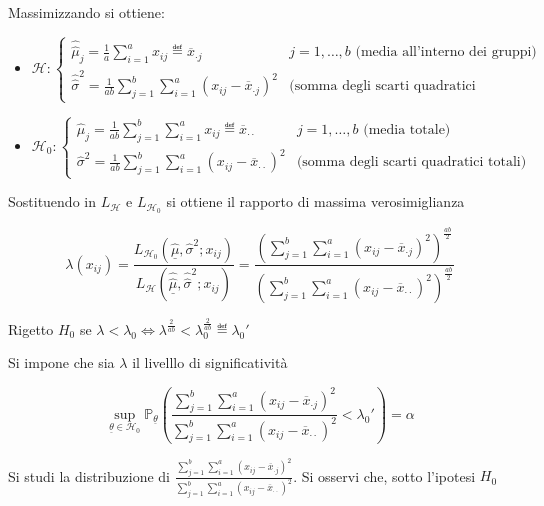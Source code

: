 \documentclass[hidelinks, 10pt]{report}
\begin{document}
Massimizzando si ottiene:
\begin{itemize}
\item $ \mathcal{H}: \begin{cases} \hat{\hat{\mu}}_{j} = \frac{1}{a} \sum\limits_{i = 1}^{a} x_{ij} \eqdef \overline{x}_{\cdot j} & j = 1, \dotsc, b \text{ (media all'interno dei gruppi)} \\ \hat{\hat{\sigma}}^{2} = \frac{1}{ab} \sum\limits_{j = 1}^{b} \sum\limits_{i = 1}^{a} (x_{ij} - \overline{x}_{\cdot j})^{2} & \text{(somma degli scarti quadratici all'interno dei gruppi)} \end{cases} $
\item $ \mathcal{H}_{0}: \begin{cases} \hat{\mu}_{j} = \frac{1}{ab} \sum\limits_{j = 1}^{b} \sum\limits_{i = 1}^{a} x_{ij} \eqdef \overline{x}_{\cdot \cdot} & j = 1, \dotsc, b \text{ (media totale)} \\ \hat{\sigma}^{2} = \frac{1}{ab} \sum\limits_{j = 1}^{b} \sum\limits_{i = 1}^{a} (x_{ij} - \overline{x}_{\cdot \cdot})^{2} & \text{(somma degli scarti quadratici totali)} \end{cases} $
\end{itemize}

Sostituendo in $ L_{\mathcal{H}} $ e $ L_{\mathcal{H}_{0}} $ si ottiene il rapporto di massima verosimiglianza

\[ \lambda(x_{ij}) = \frac{L_{\mathcal{H}_{0}} (\underline{\hat{\mu}}, \hat{\sigma}^{2}; x_{ij})}{L_{\mathcal{H}} (\hat{\hat{\underline{\mu}}}, \hat{\hat{\sigma}}^{2}; x_{ij})} = \frac{\left( \sum\limits_{j = 1}^{b} \sum\limits_{i = 1}^{a} (x_{ij} - \overline{x}_{\cdot j})^{2} \right)^{\frac{ab}{2}}}{\left( \sum\limits_{j = 1}^{b} \sum\limits_{i = 1}^{a} (x_{ij} - \overline{x}_{\cdot \cdot})^{2} \right)^{\frac{ab}{2}}} \]

Rigetto $ H_{0} $ se $ \lambda < \lambda_{0} \iff \lambda^{\frac{2}{ab}} < \lambda_{0}^{\frac{2}{ab}} \eqdef \lambda_{0}' $

Si impone che sia $ \lambda $ il livelllo di significativit\`a

\[ \sup\limits_{\underline{\theta} \in \mathcal{H}_{0}} \mathbb{P}_{\underline{\theta}} \left( \frac{\sum\limits_{j = 1}^{b} \sum\limits_{i = 1}^{a} (x_{ij} - \overline{x}_{\cdot j})^{2}}{\sum\limits_{j = 1}^{b} \sum\limits_{i = 1}^{a} (x_{ij} - \overline{x}_{\cdot \cdot})^{2}} < \lambda_{0}' \right) = \alpha \]

Si studi la distribuzione di $ \frac{\sum\limits_{j = 1}^{b} \sum\limits_{i = 1}^{a} (x_{ij} - \overline{x}_{\cdot j})^{2}}{\sum\limits_{j = 1}^{b} \sum\limits_{i = 1}^{a} (x_{ij} - \overline{x}_{\cdot \cdot})^{2}} $. Si osservi che, sotto l'ipotesi $ H_{0} $
\end{document}
